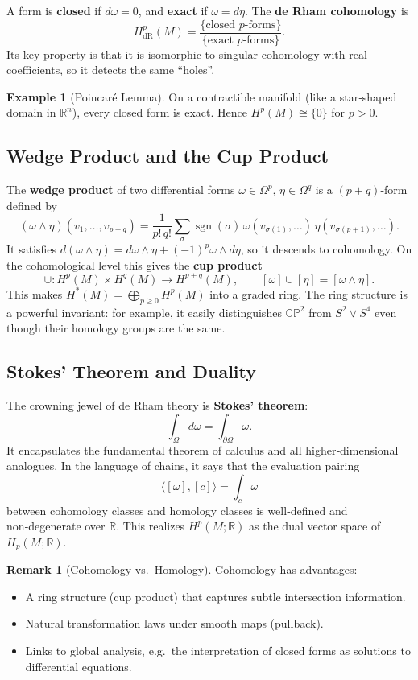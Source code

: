 \documentclass{article}
\theoremstyle{definition}
\newtheorem{example}{Example}[section]
\newtheorem{remark}{Remark}[section]
\begin{document}
A form is \textbf{closed} if $d\omega = 0$, and \textbf{exact} if $\omega = d\eta$. The \textbf{de Rham cohomology} is
\[
H^p_{\text{dR}}(M) = \frac{\{\text{closed } p\text{-forms}\}}{\{\text{exact } p\text{-forms}\}}.
\]
Its key property is that it is isomorphic to singular cohomology with real coefficients, so it detects the same “holes”.

\begin{example}[Poincaré Lemma]
On a contractible manifold (like a star‑shaped domain in $\mathbb{R}^n$), every closed form is exact. Hence $H^p(M) \cong \{0\}$ for $p>0$.
\end{example}

\subsection{Wedge Product and the Cup Product}
The \textbf{wedge product} of two differential forms $\omega \in \Omega^p$, $\eta \in \Omega^q$ is a $(p+q)$-form defined by
\[
(\omega \wedge \eta)(v_1,\dots,v_{p+q}) = \frac{1}{p!\, q!}\sum_{\sigma} \operatorname{sgn}(\sigma)\, \omega(v_{\sigma(1)},\dots) \, \eta(v_{\sigma(p+1)},\dots).
\]
It satisfies $d(\omega\wedge\eta) = d\omega\wedge\eta + (-1)^p \omega\wedge d\eta$, so it descends to cohomology.
On the cohomological level this gives the \textbf{cup product}
\[
\cup : H^p(M) \times H^q(M) \longrightarrow H^{p+q}(M),\qquad [\omega]\cup[\eta] = [\omega\wedge\eta].
\]
This makes $H^*(M) = \bigoplus_{p\ge 0} H^p(M)$ into a graded ring. The ring structure is a powerful invariant: for example, it easily distinguishes $\mathbb{CP}^2$ from $S^2\vee S^4$ even though their homology groups are the same.

\subsection{Stokes' Theorem and Duality}
The crowning jewel of de Rham theory is \textbf{Stokes' theorem}:
\[
\int_\Omega d\omega = \int_{\partial\Omega} \omega.
\]
It encapsulates the fundamental theorem of calculus and all higher‑dimensional analogues. In the language of chains, it says that the evaluation pairing
\[
\langle [\omega], [c]\rangle = \int_c \omega
\]
between cohomology classes and homology classes is well‑defined and non‑degenerate over $\mathbb{R}$. This realizes $H^p(M;\mathbb{R})$ as the dual vector space of $H_p(M;\mathbb{R})$.

\begin{remark}[Cohomology vs.\ Homology]
Cohomology has advantages:
\begin{itemize}
    \item A ring structure (cup product) that captures subtle intersection information.
    \item Natural transformation laws under smooth maps (pullback).
    \item Links to global analysis, e.g.\ the interpretation of closed forms as solutions to differential equations.
\end{itemize}
\end{remark}
\end{document}
